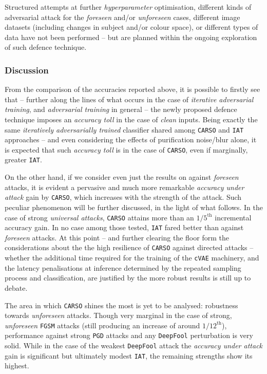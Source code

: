 Structured attempts at further \textit{hyperparameter} optimisation, different kinds of adversarial attack for the \textit{foreseen} and/or \textit{unforeseen} cases, different image datasets (including changes in subject and/or colour space), or different types of data have not been performed -- but are planned within the ongoing exploration of such defence technique.

\subsubsection{Discussion}

From the comparison of the accuracies reported above, it is possible to firstly see that -- further along the lines of what occurs in the case of \textit{iterative adversarial training}, and \textit{adversarial training} in general -- the newly proposed defence technique imposes an \textit{accuracy toll} in the case of \textit{clean} inputs. Being exactly the same \textit{iteratively adversarially trained} classifier shared among \texttt{CARSO} and \texttt{IAT} approaches -- and even considering the effects of purification noise/blur alone, it is expected that such \textit{accuracy toll} is in the case of \texttt{CARSO}, even if marginally, greater \wrt \texttt{IAT}.

On the other hand, if we consider even just the results on against \textit{foreseen} attacks, it is evident a pervasive and much more remarkable \textit{accuracy under attack} gain by \texttt{CARSO}, which increases with the strength of the attack. Such peculiar phenomenon will be further discussed, in the light of what follows. In the case of strong \textit{universal attacks}, \texttt{CARSO} attains more than an $1/5^{\text{th}}$ incremental  accuracy gain. In no case among those tested, \texttt{IAT} fared better than \carso against \textit{foreseen} attacks. At this point -- and further clearing the floor form the considerations about the the high resilience of \texttt{CARSO} against directed attacks -- whether the additional time required for the training of the \texttt{cVAE} machinery, and the latency penalisations at inference determined by the repeated sampling process and classification, are justified by the more robust results is still up to debate.

The area in which \texttt{CARSO} shines the most is yet to be analysed: robustness towards \textit{unforeseen} attacks. Though very marginal in the case of strong, \textit{unforeseen} \texttt{FGSM} attacks (still producing an increase of around $1/12^{\text{th}}$), performance against strong \texttt{PGD} attacks and any \texttt{DeepFool} perturbation is very solid. While in the case of the weakest \texttt{DeepFool} attack the \textit{accuracy under attack} gain is significant but ultimately modest \wrt \texttt{IAT}, the remaining strengths show its highest.

